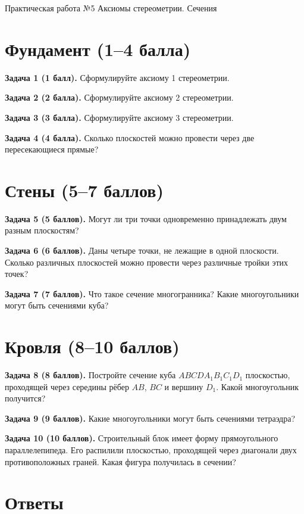 \documentclass{umk-matematika}
\begin{document}
\maketitlepage
    {Практическая работа №5}
    {Аксиомы стереометрии. Сечения}
    {}

\section{Фундамент (1--4 балла)}

\textbf{Задача 1 (1 балл).} Сформулируйте аксиому 1 стереометрии.

\textbf{Задача 2 (2 балла).} Сформулируйте аксиому 2 стереометрии.

\textbf{Задача 3 (3 балла).} Сформулируйте аксиому 3 стереометрии.

\textbf{Задача 4 (4 балла).} Сколько плоскостей можно провести через две пересекающиеся прямые?

\section{Стены (5--7 баллов)}

\textbf{Задача 5 (5 баллов).} Могут ли три точки одновременно принадлежать двум разным плоскостям?

\textbf{Задача 6 (6 баллов).} Даны четыре точки, не лежащие в одной плоскости. Сколько различных плоскостей можно провести через различные тройки этих точек?

\textbf{Задача 7 (7 баллов).} Что такое сечение многогранника? Какие многоугольники могут быть сечениями куба?

\section{Кровля (8--10 баллов)}

\textbf{Задача 8 (8 баллов).} Постройте сечение куба $ABCDA_1B_1C_1D_1$ плоскостью, проходящей через середины рёбер $AB$, $BC$ и вершину $D_1$. Какой многоугольник получится?

\textbf{Задача 9 (9 баллов).} Какие многоугольники могут быть сечениями тетраэдра?

\textbf{Задача 10 (10 баллов).} Строительный блок имеет форму прямоугольного параллелепипеда. Его распилили плоскостью, проходящей через диагонали двух противоположных граней. Какая фигура получилась в сечении?

\newpage
\section*{Ответы}
\end{document}
